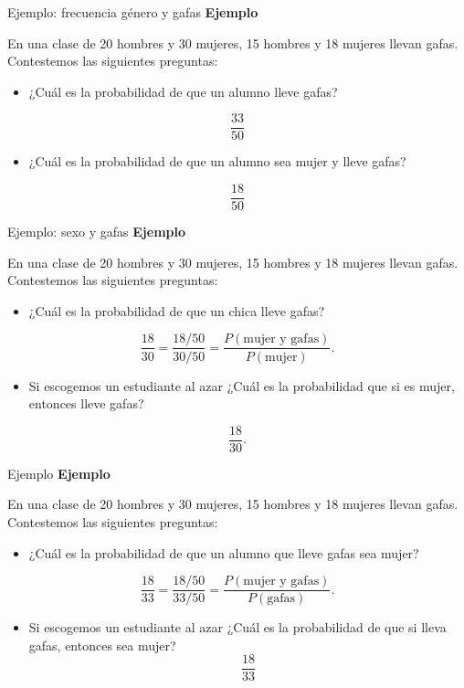 \documentclass[
  ignorenonframetext,
]{beamer}
\providecommand{\tightlist}{%
  \setlength{\itemsep}{0pt}\setlength{\parskip}{0pt}}
\begin{document}
\begin{frame}{Ejemplo: frecuencia género y gafas}
\protect\hypertarget{ejemplo-frecuencia-guxe9nero-y-gafas}{}
\textbf{Ejemplo}

En una clase de 20 hombres y 30 mujeres, 15 hombres y 18 mujeres llevan
gafas. Contestemos las siguientes preguntas:

\begin{itemize}
\tightlist
\item
  ¿Cuál es la probabilidad de que un alumno lleve gafas?
\end{itemize}

\[
\frac{33}{50}
\]

\begin{itemize}
\tightlist
\item
  ¿Cuál es la probabilidad de que un alumno sea mujer y lleve gafas?
\end{itemize}

\[
\frac{18}{50}
\]
\end{frame}

\begin{frame}{Ejemplo: sexo y gafas}
\protect\hypertarget{ejemplo-sexo-y-gafas}{}
\textbf{Ejemplo}

En una clase de 20 hombres y 30 mujeres, 15 hombres y 18 mujeres llevan
gafas. Contestemos las siguientes preguntas:

\begin{itemize}
\tightlist
\item
  ¿Cuál es la probabilidad de que un chica lleve gafas?
\end{itemize}

\[
\frac{18}{30}=\frac{18/50}{30/50}=\frac{P(\mbox{mujer  y gafas})}{P(\mbox{mujer})}.
\]

\begin{itemize}
\tightlist
\item
  Si escogemos un estudiante al azar ¿Cuál es la probabilidad que si es
  mujer, entonces lleve gafas?
\end{itemize}

\[
\frac{18}{30}.
\]
\end{frame}

\begin{frame}{Ejemplo}
\protect\hypertarget{ejemplo}{}
\textbf{Ejemplo}

En una clase de 20 hombres y 30 mujeres, 15 hombres y 18 mujeres llevan
gafas. Contestemos las siguientes preguntas:

\begin{itemize}
\tightlist
\item
  ¿Cuál es la probabilidad de que un alumno que lleve gafas sea mujer?
\end{itemize}

\[
\frac{18}{33}=\frac{18/50}{33/50}=\frac{P(\mbox{mujer y gafas})}{P(\mbox{gafas})}.
\]

\begin{itemize}
\tightlist
\item
  Si escogemos un estudiante al azar ¿Cuál es la probabilidad de que si
  lleva gafas, entonces sea mujer? \[
  \frac{18}{33}
  \]
\end{itemize}
\end{frame}
\end{document}
